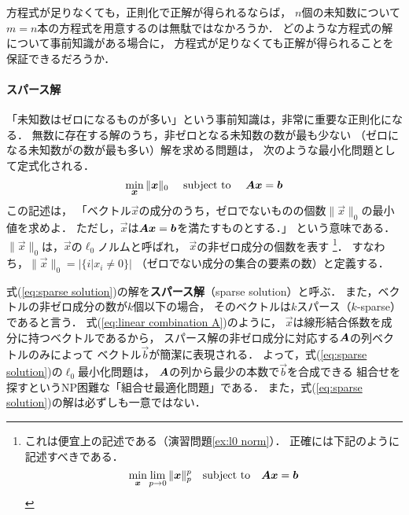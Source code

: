 方程式が足りなくても，正則化で正解が得られるならば，
$n$個の未知数について$m=n$本の方程式を用意するのは無駄ではなかろうか．
どのような方程式の解について事前知識がある場合に，
方程式が足りなくても正解が得られることを保証できるだろうか．




\paragraph{スパース解}

「未知数はゼロになるものが多い」という事前知識は，非常に重要な正則化になる．
無数に存在する解のうち，非ゼロとなる未知数の数が最も少ない
（ゼロになる未知数がの数が最も多い）解を求める問題は，
次のような最小化問題として定式化される．
\begin{equation}
 \min_{\small\mbox{\boldmath $x$}}\|\mbox{\boldmath $x$}\|_0\quad\mbox{ subject to }\quad \mbox{\boldmath $A$}\mbox{\boldmath $x$}=\mbox{\boldmath $b$}
\label{eq:sparse solution}
\end{equation}
この記述は，
「ベクトル$\vec x$の成分のうち，ゼロでないものの個数$\|\vec x\|_0$の最小値を求めよ．
ただし，$\vec x$は$\mbox{\boldmath $A$}\mbox{\boldmath $x$}=\mbox{\boldmath $b$}$を満たすものとする．」
という意味である．
$\|\vec x\|_0$は，$\vec x$の$\ell_0$ノルムと呼ばれ，
$\vec x$の非ゼロ成分の個数を表す
\footnote{%
これは便宜上の記述である（演習問題\ref{ex:l0 norm}）．
正確には下記のように記述すべきである．
\[
 \min_{\scriptsize\mbox{\boldmath $x$}}\lim_{p\rightarrow 0}\|\mbox{\boldmath $x$}\|_p^p\quad\mbox{subject to}\quad \mbox{\boldmath $A$}\mbox{\boldmath $x$}=\mbox{\boldmath $b$}
\]
}．
すなわち，$\|\vec x\|_0=|\{i|x_i\neq 0\}|$
（ゼロでない成分の集合の要素の数）と定義する．

式(\ref{eq:sparse solution})の解を{\bf スパース解}（sparse solution）と呼ぶ．
また，ベクトルの非ゼロ成分の数が$k$個以下の場合，
そのベクトルは$k$スパース（$k$-sparse）であると言う．
式(\ref{eq:linear combination A})のように，
$\vec x$は線形結合係数を成分に持つベクトルであるから，
スパース解の非ゼロ成分に対応する$\mbox{\boldmath $A$}$の列ベクトルのみによって
ベクトル$\vec b$が簡潔に表現される．
よって，式(\ref{eq:sparse solution})の$\ell_0$最小化問題は，
$\mbox{\boldmath $A$}$の列から最少の本数で$\vec b$を合成できる
組合せを探すというNP困難な「組合せ最適化問題」である．
また，式(\ref{eq:sparse solution})の解は必ずしも一意ではない．


